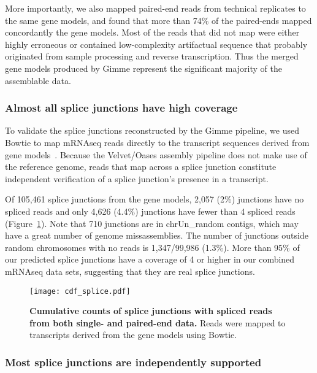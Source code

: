More importantly, we also mapped paired-end reads from technical replicates to
the same gene models, and found that more than 74\% of the paired-ends mapped
concordantly the gene models.  Most of the reads that did not map were either
highly erroneous or contained low-complexity artifactual sequence that probably
originated from sample processing and reverse transcription.  Thus the
merged gene models produced by Gimme represent the significant majority of the
assemblable data.

\subsubsection{Almost all splice junctions have high coverage}

To validate the splice junctions reconstructed by the Gimme pipeline,
we used Bowtie to map mRNAseq reads directly to the transcript sequences
derived from gene models~\cite{Langmead:2009fv}.  Because the
Velvet/Oases assembly pipeline does not make use of the reference
genome, reads that map across a splice junction constitute independent
verification of a splice junction's presence in a transcript.

Of 105,461 splice junctions from the gene models, 2,057 (2\%) junctions have no
spliced reads and only 4,626 (4.4\%) junctions have fewer than 4 spliced reads
(Figure~\ref{cdf_splice}).  Note that 710 junctions are in chrUn\_random contigs,
which may have a great number of genome missassemblies. The number of junctions
outside random chromosomes with no reads is 1,347/99,986 (1.3\%).
More than 95\% of our predicted splice junctions have a coverage
of 4 or higher in our combined mRNAseq data sets, suggesting that they are
real splice junctions.

\clearpage\pagestyle{lscape}
\begin{landscape}
\begin{figure}[!ht]
\begin{center}
\texttt{[image: cdf\_splice.pdf]}
\end{center}
\caption{
    \textbf{Cumulative counts of splice junctions with spliced
    reads from both single- and paired-end data.}
    Reads were mapped to transcripts derived from the gene models
    using Bowtie.
}
\label{cdf_splice}
\end{figure}
\end{landscape}
\pagestyle{plain}

\subsubsection{Most splice junctions are independently supported}

